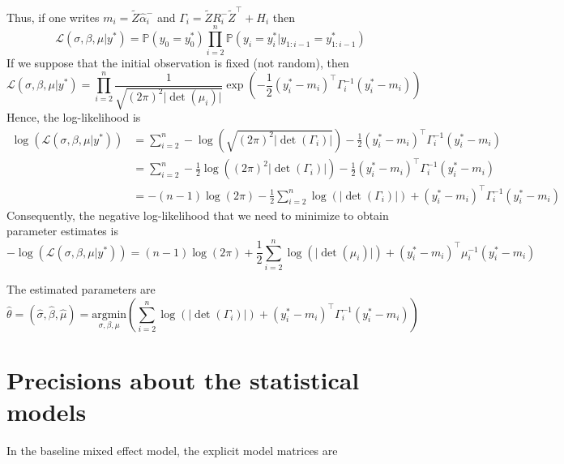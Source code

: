 \documentclass[11pt]{article}
\newcommand {\1}{\mathbb{1}}
\begin{document}
Thus, if one writes $m_i=\tilde{Z} \hat{\alpha}_i^-$ and $\Gamma_i=\tilde{Z} R_i^- \tilde{Z}^\top +H_i$ then 
\[\mathcal{L}(\sigma, \beta, \mu \vert y^*) =\mathbb{P}(y_0=y_0^*) \prod_{i=2}^n \mathbb{P}(y_i=y_i^* \vert y_{1:i-1}=y_{1:i-1}^*)\]
If we suppose that the initial observation is fixed (not random), then
\[\mathcal{L}(\sigma, \beta, \mu \vert y^*) = \prod_{i=2}^n \frac{1}{\sqrt{(2\pi)^2 \vert \det(\mu_i) \vert}} \exp \left( -\frac{1}{2} (y_i^*-m_i)^\top \Gamma_i^{-1} (y_i^*-m_i) \right) \]
Hence, the log-likelihood is 
\begin{align*}
    \log \left(\mathcal{L}(\sigma,\beta,\mu \vert y^*)\right)&=\sum_{i=2}^n -\log(\sqrt{(2\pi)^2 \vert \det(\Gamma_i) \vert}) -\frac{1}{2} (y^*_i-m_i)^\top \Gamma_i^{-1} (y^*_i-m_i)\\
    &=\sum_{i=2}^n -\frac{1}{2}\log\left((2\pi)^2 \vert \det(\Gamma_i) \vert\right) -\frac{1}{2} (y^*_i-m_i)^\top \Gamma_i^{-1} (y^*_i-m_i) \\
    &=-(n-1)\log(2\pi)-\frac{1}{2} \sum_{i=2}^n \log(\vert \det(\Gamma_i) \vert) +(y^*_i-m_i)^\top \Gamma_i^{-1} (y^*_i-m_i)
\end{align*}
Consequently, the negative log-likelihood that we need to minimize to obtain parameter estimates is 
\[
-\log \left(\mathcal{L}(\sigma,\beta,\mu \vert y^*)\right)=(n-1)\log(2\pi)+\frac{1}{2} \sum_{i=2}^n \log(\vert \det(\mu_i) \vert) +(y^*_i-m_i)^\top \mu_i^{-1} (y^*_i-m_i)
\]

The estimated parameters are 
\[\hat{\theta}=(\hat{\sigma},\hat{\beta},\hat{\mu})=\underset{\sigma,\beta,\mu}{\mathrm{argmin}} \left( \sum_{i=2}^n \log(\vert \det(\Gamma_i) \vert) +(y^*_i-m_i)^\top \Gamma_i^{-1} (y^*_i-m_i) \right) \]

\section{Precisions about the statistical models}

In the baseline mixed effect model, the explicit model matrices are 
\end{document}
